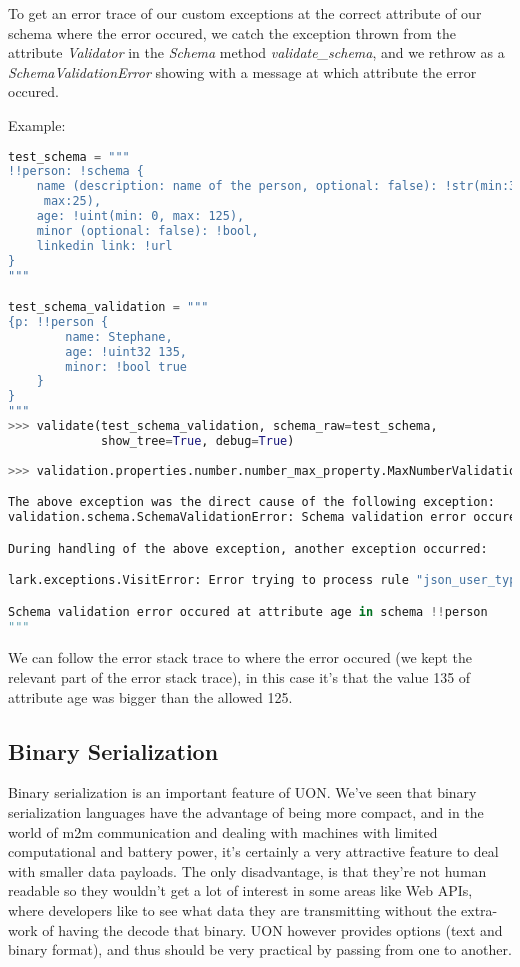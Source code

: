 \documentclass[12pt]{article}
\begin{document}
To get an error trace of our custom exceptions at the correct attribute of our schema where the error occured, we catch the exception thrown from the attribute \emph{Validator} in the \emph{Schema} method \emph{validate\_schema}, and we rethrow as a \emph{SchemaValidationError} showing with a message at which attribute the error occured.

Example: 
\begin{lstlisting}[language=Python]
test_schema = """
!!person: !schema {
    name (description: name of the person, optional: false): !str(min:3,
     max:25),
    age: !uint(min: 0, max: 125),
    minor (optional: false): !bool,
    linkedin link: !url
}
"""

test_schema_validation = """
{p: !!person {
        name: Stephane,
        age: !uint32 135,
        minor: !bool true
    }
}
"""
>>> validate(test_schema_validation, schema_raw=test_schema,
             show_tree=True, debug=True)
             
>>> validation.properties.number.number_max_property.MaxNumberValidationError: The following input !uint32 135 is bigger than 125

The above exception was the direct cause of the following exception:
validation.schema.SchemaValidationError: Schema validation error occured at attribute age in schema !!person

During handling of the above exception, another exception occurred:

lark.exceptions.VisitError: Error trying to process rule "json_user_type":

Schema validation error occured at attribute age in schema !!person
"""
\end{lstlisting}
We can follow the error stack trace to where the error occured (we kept the relevant part of the error stack trace), in this case it's that the value 135 of attribute age was bigger than the allowed 125. 

\pagebreak

\subsection{Binary Serialization}
Binary serialization is an important feature of UON. We've seen that binary serialization languages have the advantage of being more compact, and in the world of m2m communication and dealing with machines with limited computational and battery power, it's certainly a very attractive feature to deal with smaller data payloads. The only disadvantage, is that they're not human readable so they wouldn't get a lot of interest in some areas like Web APIs, where developers like to see what data they are transmitting without the extra-work of having the decode that binary. UON however provides options (text and binary format), and thus should be very practical by passing from one to another.
\end{document}
